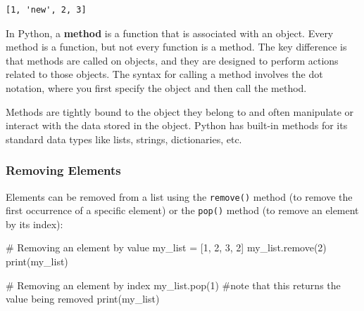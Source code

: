 \documentclass[
  letterpaper,
  DIV=11,
  numbers=noendperiod]{scrreprt}
\newenvironment{Shaded}{\begin{snugshade}}{\end{snugshade}}
\newcommand{\BuiltInTok}[1]{\textcolor[rgb]{0.00,0.23,0.31}{#1}}
\newcommand{\CommentTok}[1]{\textcolor[rgb]{0.37,0.37,0.37}{#1}}
\newcommand{\DecValTok}[1]{\textcolor[rgb]{0.68,0.00,0.00}{#1}}
\newcommand{\NormalTok}[1]{\textcolor[rgb]{0.00,0.23,0.31}{#1}}
\newcommand{\OperatorTok}[1]{\textcolor[rgb]{0.37,0.37,0.37}{#1}}
\begin{document}
\begin{verbatim}
[1, 'new', 2, 3]
\end{verbatim}

\begin{tcolorbox}[enhanced jigsaw, coltitle=black, colback=white, bottomrule=.15mm, arc=.35mm, titlerule=0mm, opacitybacktitle=0.6, toptitle=1mm, left=2mm, toprule=.15mm, opacityback=0, bottomtitle=1mm, title=\textcolor{quarto-callout-note-color}{\faInfo}\hspace{0.5em}{Note}, rightrule=.15mm, colframe=quarto-callout-note-color-frame, breakable, colbacktitle=quarto-callout-note-color!10!white, leftrule=.75mm]

In Python, a \textbf{method} is a function that is associated with an
object. Every method is a function, but not every function is a method.
The key difference is that methods are called on objects, and they are
designed to perform actions related to those objects. The syntax for
calling a method involves the dot notation, where you first specify the
object and then call the method.

Methods are tightly bound to the object they belong to and often
manipulate or interact with the data stored in the object. Python has
built-in methods for its standard data types like lists, strings,
dictionaries, etc.

\end{tcolorbox}

\hypertarget{removing-elements}{%
\subsubsection{Removing Elements}\label{removing-elements}}

Elements can be removed from a list using the \texttt{remove()} method
(to remove the first occurrence of a specific element) or the
\texttt{pop()} method (to remove an element by its index):

\begin{Shaded}
\begin{Highlighting}[]
\CommentTok{\# Removing an element by value}
\NormalTok{my\_list }\OperatorTok{=}\NormalTok{ [}\DecValTok{1}\NormalTok{, }\DecValTok{2}\NormalTok{, }\DecValTok{3}\NormalTok{, }\DecValTok{2}\NormalTok{]}
\NormalTok{my\_list.remove(}\DecValTok{2}\NormalTok{)}
\BuiltInTok{print}\NormalTok{(my\_list)  }

\CommentTok{\# Removing an element by index}
\NormalTok{my\_list.pop(}\DecValTok{1}\NormalTok{) }\CommentTok{\#note that this returns the value being removed}
\BuiltInTok{print}\NormalTok{(my\_list)}
\end{Highlighting}
\end{Shaded}
\end{document}
